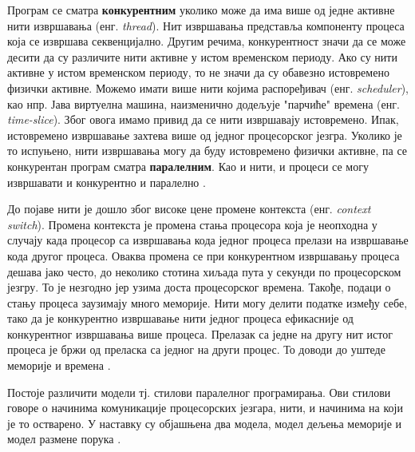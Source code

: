 \documentclass[12pt,oneside]{memoir}
\begin{document}
Програм се сматра \textbf{конкурентним} уколико може да има више од једне активне нити извршавања  (енг. \textit{thread}). Нит извршавања представља компоненту процеса која се извршава секвенцијално. Другим речима, конкурентност значи да се може десити да су различите нити активне у истом временском периоду. Ако су нити активне у истом временском периоду, то не значи да су обавезно истовремено физички активне. Можемо имати више нити којима распоређивач (енг. \textit{scheduler}), као нпр. Јава виртуелна машина, наизменично додељује "парчиће" времена (енг. \textit{time-slice}). Због овога имамо привид да се нити извршавају истовремено. Ипак, истовремено извршавање захтева више од једног процесорског језгра. Уколико је то испуњено, нити извршавања могу да буду истовремено физички активне, па се конкурентан програм сматра \textbf{паралелним}. Као и нити, и процеси се могу извршавати и конкурентно и паралелно \cite{progLangPragm, konkMalkov}.

До појаве нити је дошло због високе цене промене контекста (енг. \textit{context switch}). Промена контекста је промена стања процесора која је неопходна у случају када процесор са извршавања кода једног процеса прелази на извршавање кода другог процеса. Оваква промена се при конкурентном извршавању процеса дешава јако често, до неколико стотина хиљада пута у секунди по процесорском језгру. То је незгодно јер узима доста процесорског времена. Такође, подаци о стању процеса заузимају много меморије. Нити могу делити податке између себе, тако да је конкурентно извршавање нити једног процеса ефикасније од конкурентног извршавања више процеса. Прелазак са једне на другу нит истог процеса је бржи од преласка са једног на други процес. То доводи до уштеде меморије и времена  \cite{progLangPragm, konkMalkov, survey}.

Постоје различити модели тј. стилови паралелног програмирања. Ови стилови говоре о начинима комуникације процесорских језгара, нити, и начинима на који је то остварено. У наставку су објашњена два модела, модел дељења меморије и модел размене порука \cite{survey}.
 
\end{document}
